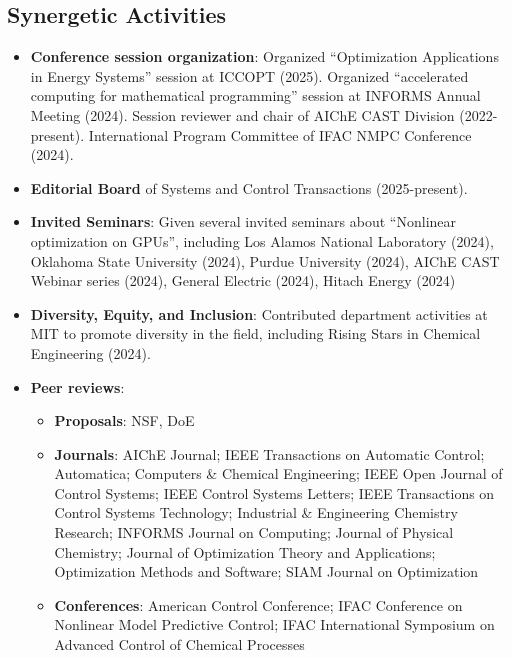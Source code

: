 \documentclass[letterpaper, 11pt]{article}
\begin{document}
\subsection*{Synergetic Activities}
\begin{itemize}[itemsep=1pt, parsep=0pt,leftmargin=*]
\item \textbf{Conference session organization}: Organized ``Optimization Applications in Energy Systems'' session at ICCOPT (2025). Organized ``accelerated computing for mathematical programming'' session at INFORMS Annual Meeting (2024). Session reviewer and chair of AIChE CAST Division (2022-present). International Program Committee of IFAC NMPC Conference (2024).  
\item \textbf{Editorial Board} of Systems and Control Transactions (2025-present).
\item \textbf{Invited Seminars}: Given several invited seminars about ``Nonlinear optimization on GPUs'', including Los Alamos National Laboratory (2024), Oklahoma State University (2024), Purdue University (2024), AIChE CAST Webinar series (2024), General Electric (2024), Hitach Energy (2024)
\item \textbf{Diversity, Equity, and Inclusion}: Contributed department activities at MIT to promote diversity in the field, including Rising Stars in Chemical Engineering (2024).
\item \textbf{Peer reviews}:
  \begin{itemize}[leftmargin=*]
  \item[] {\bf Proposals}: NSF, DoE
  \item[] {\bf Journals}: AIChE Journal; IEEE Transactions on Automatic Control; Automatica; Computers \& Chemical Engineering; IEEE Open Journal of Control Systems; IEEE Control Systems Letters; IEEE Transactions on Control Systems Technology; Industrial \& Engineering Chemistry Research; INFORMS Journal on Computing; Journal of Physical Chemistry; Journal of Optimization Theory and Applications; Optimization Methods and Software; SIAM Journal on Optimization
  \item[] {\bf Conferences}: American Control Conference; IFAC Conference on Nonlinear Model Predictive Control; IFAC International Symposium on Advanced Control of Chemical Processes 
  \end{itemize}  
\end{itemize}





\end{document}
